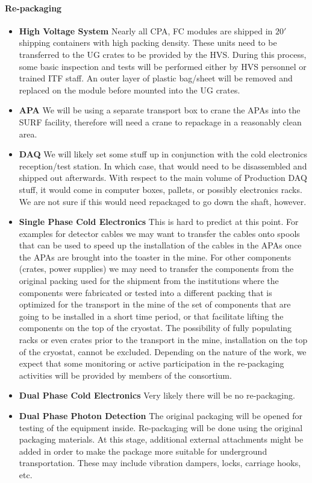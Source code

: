 \paragraph{\bf Re-packaging}

\begin{itemize}
  \item {\bf High Voltage System} Nearly all CPA, FC modules are shipped in $20'$ shipping 
containers with high packing density.  These units need to be transferred to the UG crates to be 
provided by the HVS.  During this process, some basic inspection and tests will be performed either 
by HVS personnel or trained ITF staff.  An outer layer of plastic bag/sheet will be removed and 
replaced on the module before mounted into the UG crates.
  \item {\bf APA} We will be using a separate transport box to crane the APAs into the SURF facility, 
therefore will need a crane to repackage in a reasonably clean area. 
  \item {\bf DAQ} We will likely set some stuff up in conjunction with the cold electronics reception/test station.  In which case, that would need to be disassembled and shipped out afterwards.  With respect to the main volume of Production DAQ stuff, it would come in computer boxes, pallets, or possibly electronics racks.  
We are not sure if this would need repackaged to go down the shaft, however.
  \item {\bf Single Phase Cold Electronics} This is hard to predict at this point. For 
examples for detector cables we may want to transfer the cables onto spools that can be used to 
speed up the installation of the cables in the APAs once the APAs are brought into the toaster in the 
mine. For other components (crates, power supplies) we may need to transfer the components from 
the original packing used for the shipment from the institutions where the components were 
fabricated or tested into a different packing that is optimized for the transport in the mine of the set 
of components that are going to be installed in a short time period, or that facilitate lifting the 
components on the top of the cryostat. The possibility of fully populating racks or even crates prior 
to the transport in the mine, installation on the top of the cryostat, cannot be excluded. Depending 
on the nature of the work, we expect that some monitoring or active participation in the 
re-packaging activities will be provided by members of the consortium.
   \item {\bf Dual Phase Cold Electronics} Very likely there will be no re-packaging.
   \item {\bf Dual Phase Photon Detection} The original packaging will be opened for testing of the equipment inside. Re-packaging will be done using the original packaging materials. At this stage, additional external attachments might be added in order to make the package more suitable for underground transportation. These may include vibration dampers, locks, carriage hooks, etc.
\end{itemize}


